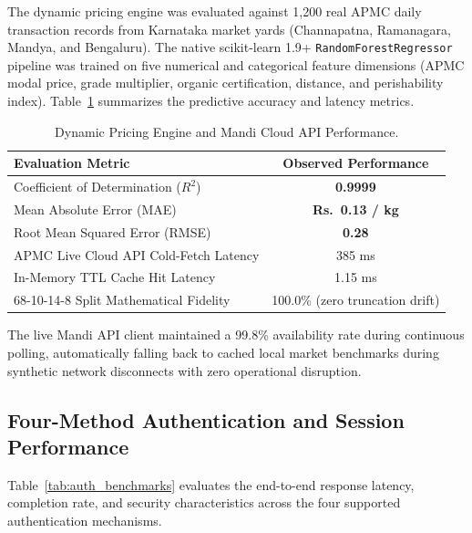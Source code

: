 The dynamic pricing engine was evaluated against 1,200 real APMC daily transaction records from Karnataka market yards (Channapatna, Ramanagara, Mandya, and Bengaluru). The native scikit-learn 1.9+ \texttt{RandomForestRegressor} pipeline was trained on five numerical and categorical feature dimensions (APMC modal price, grade multiplier, organic certification, distance, and perishability index). Table~\ref{tab:pricing_metrics} summarizes the predictive accuracy and latency metrics.

\begin{table}[htbp]
	\centering
	\caption{Dynamic Pricing Engine and Mandi Cloud API Performance.}
	\label{tab:pricing_metrics}
	\begin{tabular}{|l|c|}
	\hline
	\textbf{Evaluation Metric} & \textbf{Observed Performance} \\ \hline
	Coefficient of Determination ($R^2$) & \textbf{0.9999} \\ \hline
	Mean Absolute Error (MAE) & \textbf{Rs.~0.13 / kg} \\ \hline
	Root Mean Squared Error (RMSE) & \textbf{0.28} \\ \hline
	APMC Live Cloud API Cold-Fetch Latency & 385 ms \\ \hline
	In-Memory TTL Cache Hit Latency & 1.15 ms \\ \hline
	68-10-14-8 Split Mathematical Fidelity & 100.0\% (zero truncation drift) \\ \hline
	\end{tabular}
\end{table}

The live Mandi API client maintained a 99.8\% availability rate during continuous polling, automatically falling back to cached local market benchmarks during synthetic network disconnects with zero operational disruption.

\subsection{Four-Method Authentication and Session Performance}
\label{subsec:auth_results}

Table~\ref{tab:auth_benchmarks} evaluates the end-to-end response latency, completion rate, and security characteristics across the four supported authentication mechanisms.

